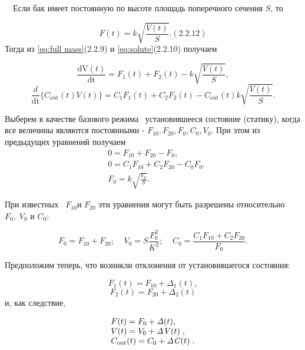 		\ \ Если бак имеет постоянную по высоте площадь поперечного сечения  $S$, то

\begin{equation}\label{key}
 F(t)=k\sqrt{\frac{V(t)} S}.  (2.2.12)
\end{equation}
		Тогда из \eqref{eq:full mass}(2.2.9) и \eqref{eq:solute}(2.2.10) получаем


\begin{equation*}
\frac{\text{dV}(t)}{\text{dt}}=F_1(t)+F_2(t)-k\sqrt{\frac{V(t)} S},
\end{equation*}
\begin{equation*}
\frac
d{\text{dt}}\{C_{\text{out}}(t)V(t)\}=C_1F_1(t)+C_2F_2(t)-C_{\text{out}}(t)k\sqrt{\frac{V(t)}
	S}.
\end{equation*}

		Выберем в качестве базового режима \ установившееся состояние (статику), когда все величины являются постоянными - 
		$F_{10},F_{20},F_0,C_0,V_0$. При этом из предыдущих уравнений получаем
\begin{align*}
		&0=F_{10}+F_{20}-F_0,\\
		&0=C_1F_{10}+C_2F_{20}-C_0F_0.\\
		&F_0=k\sqrt{\frac{V_0} S}.
\end{align*}



		При известных \  $F_{10}$и  $F_{20}$ эти уравнения могут быть разрешены относительно  $F_0,\;V_0$ и		$C_0$:
		
\begin{equation*}
		F_0=F_{10}+F_{20};\;\;\;\;V_0=S\frac{F_0^2}{K^2};\;\;\;\;C_0=\frac{C_1F_{10}+C_2F_{20}}{F_0}.
\end{equation*}



		Предположим теперь, что возникли отклонения от установившегося состояния:



\begin{equation*}
		 F_1(t)=F_{10}+\mathit{\Delta }_1(t),
\end{equation*}
\begin{equation*}
F_2(t)=F_{20}+\mathit{\Delta  }_2(t)
\end{equation*}
 и, как следствие,

\begin{equation*}
\begin{matrix}F(t)=F_0+\mathit{\Delta  }(t),\hfill\null \\V(t)=V_0+\mathit{\Delta V}(t)\;,\hfill\null
\\C_{\normalsubformula{\text{out}}}(t)=C_0+\mathit{\Delta C}(t)\;.\hfill\null \end{matrix}\hfill 
\end{equation*}


